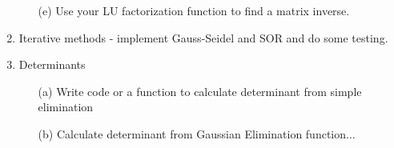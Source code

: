 \documentclass{article}
\begin{document}
\begin{enumerate}
\begin{itemize}
    \item[(e)] Use your LU factorization function to find a matrix inverse.  
  \end{itemize}
  \item Iterative methods - implement Gauss-Seidel and SOR and do some testing.  
  \item Determinants
  \begin{itemize}
    \item[(a)] Write code or a function to calculate determinant from simple elimination  
    \item[(b)] Calculate determinant from Gaussian Elimination function...
  \end{itemize}
\end{enumerate}
\end{document}
